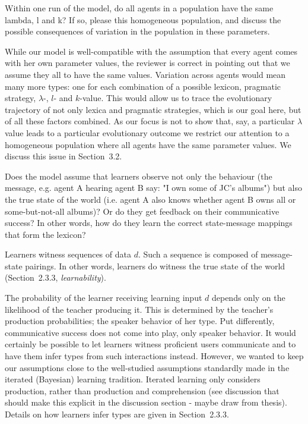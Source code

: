 \documentclass[12pt,a4paper]{article}
\newcommand{\hl}[1]{\textcolor[rgb]{.8,.33,.0}{#1}}%
\begin{document}
\vspace{.5cm}
  \begin{mdframed}[backgroundcolor=gray!25,linecolor=gray!25]
Within one run of the model, do all agents in a population have the same lambda, l and k? If so, please this homogeneous population, and discuss the possible consequences of variation in the population in these parameters.
\end{mdframed}
While our model is well-compatible with the assumption that every agent comes with her own parameter values, the reviewer is correct in pointing out that we assume they all to have the same values. Variation across agents would mean many more types: one for each combination of a possible lexicon, pragmatic strategy, $\lambda$-, $l$- and $k$-value. This would allow us to trace the evolutionary trajectory of not only lexica and pragmatic strategies, which is our goal here, but of all these factors combined. As our focus is not to show that, say, a particular $\lambda$ value leads to a particular evolutionary outcome we restrict our attention to a homogeneous population where all agents have the same parameter values. \hl{We discuss this issue in Section~3.2}. 

\vspace{.5cm}
\begin{mdframed}[backgroundcolor=gray!25,linecolor=gray!25]
Does the model assume that learners observe not only the behaviour (the message, e.g. agent A hearing agent B say: "I own some of JC's albums") but also the true state of the world (i.e. agent A also knows whether agent B owns all or some-but-not-all albums)? Or do they get feedback on their communicative success? In other words, how do they learn the correct state-message mappings that form the lexicon? 
\end{mdframed}
Learners witness sequences of data $d$. Such a sequence is composed of message-state pairings. In other words, learners do witness the true state of the world (Section~2.3.3, {\em learnability}).

The probability of the learner receiving learning input $d$ depends only on the likelihood of the teacher producing it. This is determined by the teacher's production probabilities; the speaker behavior of her type. Put differently, communicative success does not come into play, only speaker behavior. It would certainly be possible to let learners witness proficient users communicate and to have them infer types from such interactions instead. However, we wanted to keep our assumptions close to the well-studied assumptions standardly made in the iterated (Bayesian) learning tradition. Iterated learning only considers production, rather than production and comprehension (\hl{see discussion that should make this explicit in the discussion section - maybe draw from thesis}). Details on how learners infer types are given in Section~2.3.3.
\end{document}
